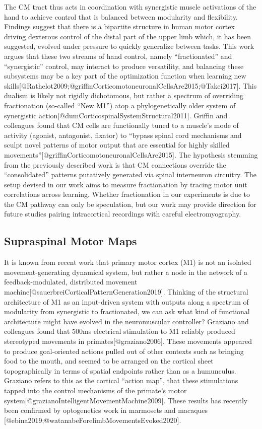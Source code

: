 \documentclass[../main.tex]{subfiles}
\begin{document}
{{{The CM tract thus acts in coordination with synergistic muscle
activations of the hand to achieve control that is balanced between
modularity and flexibility. Findings suggest that there is a bipartite
structure in human motor cortex driving dexterous control of the distal
part of the upper limb which, it has been suggested, evolved under
pressure to quickly generalize between tasks. This work argues that
these two streams of hand control, namely ``fractionated'' and
``synergistic'' control, may interact to produce versatility, and
balancing these subsystems may be a key part of the optimization
function when learning new
skills{[}@Rathelot2009;@griffinCorticomotoneuronalCellsAre2015;@Takei2017{]}.
This dualism is likely not rigidly dichotomous, but rather a spectrum of
overriding fractionation (so-called ``New M1'') atop a phylogenetically
older system of synergistic
action{[}@dumCorticospinalSystemStructural2011{]}. Griffin and
colleagues found that CM cells are functionally tuned to a muscle's mode
of activity (agonist, antagonist, fixator) to ``bypass spinal cord
mechanisms and sculpt novel patterns of motor output that are essential
for highly skilled
movements''{[}@griffinCorticomotoneuronalCellsAre2015{]}. The hypothesis
stemming from the previously described work is that CM connections
override the ``consolidated'' patterns putatively generated via spinal
interneuron circuitry. The setup devised in our work aims to measure
fractionation by tracing motor unit correlations across learning.
Whether fractionation in our experiments is due to the CM pathway can
only be speculation, but our work may provide direction for future
studies pairing intracortical recordings with careful electromyography.

\subsection{Supraspinal Motor Maps}\label{supraspinal-motor-maps}

It is known from recent work that primary motor cortex (M1) is not an
isolated movement-generating dynamical system, but rather a node in the
network of a feedback-modulated, distributed movement
machine{[}@sauerbreiCorticalPatternGeneration2019{]}. Thinking of the
structural architecture of M1 as an input-driven system with outputs
along a spectrum of modularity from synergistic to fractionated, we can
ask what kind of functional architecture might have evolved in the
neuromuscular controller? Graziano and colleagues found that 500ms
electrical stimulation to M1 reliably produced stereotyped movements in
primates{[}@graziano2006{]}. These movements appeared to produce
goal-oriented actions pulled out of other contexts such as bringing food
to the mouth, and seemed to be arranged on the cortical sheet
topographically in terms of spatial endpoints rather than as a
humunculus. Graziano refers to this as the cortical ``action map'', that
these stimulations tapped into the control mechanisms of the primate's
motor system{[}@grazianoIntelligentMovementMachine2009{]}. These results
has recently been confirmed by optogenetics work in marmosets and
macaques {[}@ebina2019;@watanabeForelimbMovementsEvoked2020{]}.

}}}
\end{document}

